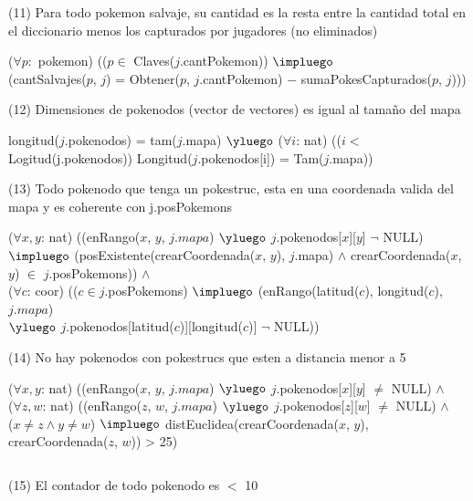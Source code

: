\begin{Representacion}
$ $\newline

(11) Para todo pokemon salvaje, su cantidad es la resta entre la cantidad total en el diccionario menos los capturados por jugadores (no eliminados) $ $\newline

($\forall p: $ pokemon) (($p \in$ Claves($j$.cantPokemon)) $\impluego$ \\ 
  (cantSalvajes($p$, $j$) = Obtener($p$, $j$.cantPokemon) $-$ sumaPokesCapturados($p$, $j$)))
$ $\newline


(12) Dimensiones de pokenodos (vector de vectores) es igual al tama\~no del mapa $ $\newline

longitud($j$.pokenodos) = tam($j$.mapa) $\yluego$ 
($\forall i$: nat) (($i <$ Logitud(j.pokenodos)) Longitud($j$.pokenodos[i]) = Tam($j$.mapa)) 
$ $\newline

(13) Todo pokenodo que tenga un pokestruc, esta en una coordenada valida del mapa y es coherente con j.posPokemons$ $\newline

($\forall x, y$: nat) ((enRango($x$, $y$, $j.mapa$) $\yluego$ $j$.pokenodos[$x$][$y$] $\neg$ NULL) \\
  $\impluego$ (posExistente(crearCoordenada($x$, $y$), $j$.mapa) $\land$ crearCoordenada($x$, $y$) $\in$ $j$.posPokemons)) $\land$ \\
($\forall c$: coor) (($c \in j$.posPokemons) $\impluego$ (enRango(latitud($c$), longitud($c$), $j.mapa$) \\
$\yluego$ $j$.pokenodos[latitud($c$)][longitud($c$)] $\neg$ NULL))
$ $\newline


(14) No hay pokenodos con pokestrucs que esten a distancia menor a 5 $ $\newline

($\forall x, y$: nat) ((enRango($x$, $y$, $j.mapa$) $\yluego$ $j$.pokenodos[$x$][$y$] $\neq$ NULL) $ \land$\\
($\forall z, w$: nat) ((enRango($z$, $w$, $j.mapa$) $\yluego$ $j$.pokenodos[$z$][$w$] $\neq$ NULL) $\land$ \\
($x \neq z \land y \neq w$) $\impluego$  distEuclidea(crearCoordenada($x$, $y$), crearCoordenada($z$, $w$)) > 25)

$ $\newline

(15) El contador de todo pokenodo es $<$ 10 $ $\newline


\end{Representacion}
